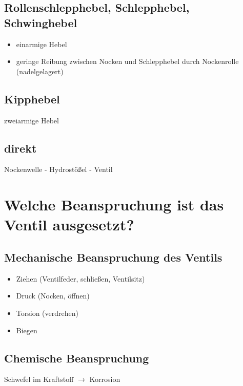 \subsection{Rollenschlepphebel, Schlepphebel,
Schwinghebel}\label{rollenschlepphebel-schlepphebel-schwinghebel}

\begin{itemize}
\item
  einarmige Hebel
\item
  geringe Reibung zwischen Nocken und Schlepphebel durch Nockenrolle
  (nadelgelagert)
\end{itemize}

\subsection{Kipphebel}\label{kipphebel}

zweiarmige Hebel

\subsection{direkt}\label{direkt}

Nockenwelle - Hydrostößel - Ventil

\section{Welche Beanspruchung ist das Ventil
ausgesetzt?}\label{welche-beanspruchung-ist-das-ventil-ausgesetzt}

\subsection{Mechanische Beanspruchung des
Ventils}\label{mechanische-beanspruchung-des-ventils}

\begin{itemize}
\item
  Ziehen (Ventilfeder, schließen, Ventilsitz)
\item
  Druck (Nocken, öffnen)
\item
  Torsion (verdrehen)
\item
  Biegen
\end{itemize}

\subsection{Chemische Beanspruchung}\label{chemische-beanspruchung}

Schwefel im Kraftstoff $\to$ Korrosion

